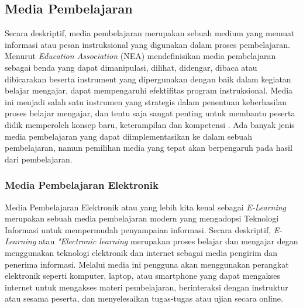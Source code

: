 \subsection{Media Pembelajaran}
Secara deskriptif, media pembelajaran merupakan sebuah medium yang memuat informasi atau pesan instruksional yang digunakan dalam proses pembelajaran\cite{hasan2021media}. 
Menurut \textit{Education Association} (NEA) mendefinisikan media pembelajaran sebagai benda yang dapat dimanipulasi, dilihat, didengar, dibaca atau dibicarakan 
beserta instrument yang dipergunakan dengan baik dalam kegiatan belajar mengajar, dapat mempengaruhi efektifitas program instruksional\cite{arsyad2011media}.
Media ini menjadi salah satu instrumen yang strategis dalam penentuan keberhasilan proses belajar mengajar, dan tentu saja sangat penting untuk membantu peserta didik memperoleh konsep baru, keterampilan dan kompetensi \cite{hasan2021media}.
Ada banyak jenis media pembelajaran yang dapat diimplementasikan ke dalam sebuah pembelajaran, namun pemilihan media yang tepat akan berpengaruh pada hasil dari pembelajaran.
\subsubsection{Media Pembelajaran Elektronik}
Media Pembelajaran Elektronik atau yang lebih kita kenal sebagai \textit{E-Learning} merupakan sebuah media pembelajaran modern yang mengadopsi Teknologi Informasi untuk mempermudah penyampaian informasi.
Secara deskriptif, \textit{E-Learning} atau \textit{"Electronic learning} merupakan proses belajar dan mengajar degan menggunakan teknologi elektronik dan internet sebagai media pengirim dan penerima informasi.
Melalui media ini pengguna akan menggunakan perangkat elektronik seperti komputer, laptop, atau smartphone yang dapat mengakses internet untuk mengakses materi pembelajaran, berinteraksi dengan instruktur atau sesama peserta, dan menyelesaikan tugas-tugas atau ujian secara online.

